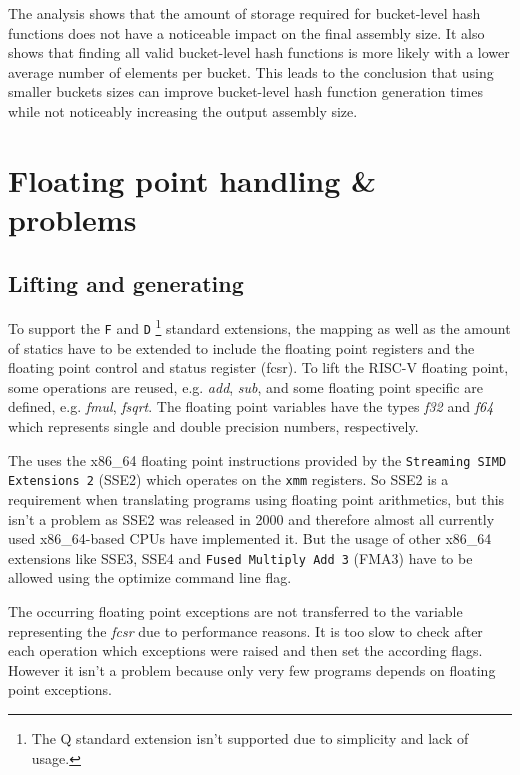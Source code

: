 \documentclass[course=eragp]{aspdoc}
\begin{document}
\par 

The analysis shows that
the amount of storage required for bucket-level hash functions does not have a noticeable impact on
the final assembly size. It also shows that finding all valid bucket-level hash functions is more
likely with a lower average number of elements per bucket. This leads to the conclusion that using 
smaller buckets sizes can improve bucket-level hash function generation times while not noticeably
increasing the output assembly size.

\section{Floating point handling \& problems}

\subsection{Lifting and generating}

To support the \texttt{F} and \texttt{D}
\footnote{The Q standard extension isn't supported due to simplicity and lack of usage.}
standard extensions, the mapping as well as the amount of statics have to be extended to include the
floating point registers and the floating point control and status register (fcsr). To lift the
RISC-V floating point, some operations are reused, e.g. \emph{add}, \emph{sub}, and some floating
point specific are defined, e.g. \emph{fmul}, \emph{fsqrt}. The floating point variables have the
types \emph{f32} and \emph{f64} which represents single and double precision numbers, respectively.

\par

The  uses the x86\_64 floating point instructions provided by the
\texttt{Streaming SIMD Extensions 2} (SSE2) which operates on the \texttt{xmm} registers. So SSE2 is
a requirement when translating programs using floating point arithmetics, but this isn't a problem
as SSE2 was released in 2000 and therefore almost all currently used x86\_64-based CPUs have
implemented it. But the usage of other x86\_64 extensions like SSE3, SSE4 and \texttt{Fused Multiply
    Add 3} (FMA3) have to be allowed using the optimize command line flag.

\par

The occurring floating point exceptions are not transferred to the variable representing the
\emph{fcsr} due to performance reasons. It is too slow to check after each operation which
exceptions were raised and then set the according flags. However it isn't a problem because only
very few programs depends on floating point exceptions.
\end{document}
